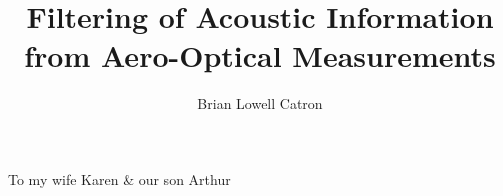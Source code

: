 \documentclass[twoadvisors,noinfo,final]{nddiss2e}
\begin{document}
  \frontmatter
    \title{ Filtering of Acoustic Information from Aero-Optical Measurements }
    \author{ Brian Lowell Catron }

    \maketitle
    \makecopyright

    \begin{abstract}
      
    \end{abstract}
    \begin{dedication}
      To my wife Karen \& our son Arthur
    \end{dedication}

    \tableofcontents
    \listoffigures
    \listoftables
    
    


  \mainmatter
    
    
    
    
    
    
    
    


  \backmatter
    
    
\end{document}
